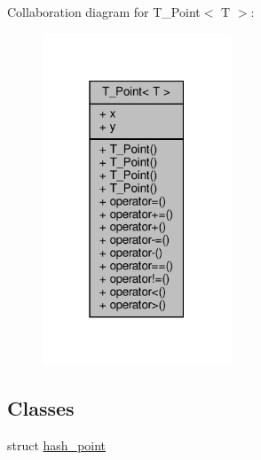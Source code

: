Collaboration diagram for T\+\_\+\+Point$<$ T $>$\+:\nopagebreak
\begin{figure}[H]
\begin{center}
\leavevmode
\includegraphics[width=159pt]{classT__Point__coll__graph}
\end{center}
\end{figure}
\subsection*{Classes}
\begin{DoxyCompactItemize}
\item 
struct \hyperlink{structT__Point_1_1hash__point}{hash\+\_\+point}
\end{DoxyCompactItemize}
